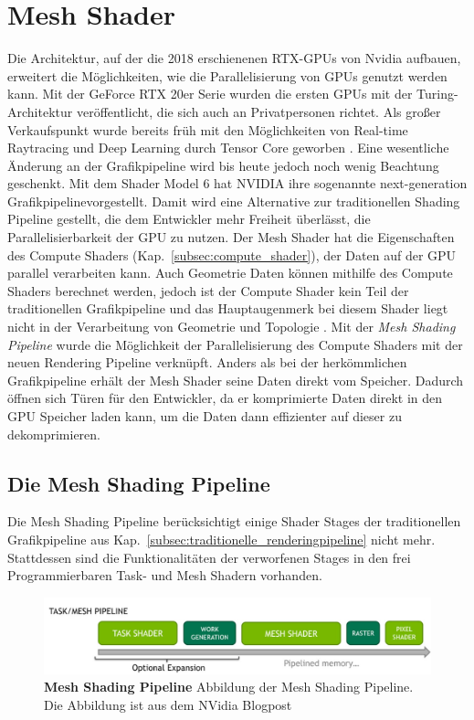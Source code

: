 \section{Mesh Shader}
Die Architektur, auf der die 2018 erschienenen RTX-GPUs von Nvidia aufbauen, erweitert die Möglichkeiten, wie die Parallelisierung von GPUs genutzt werden kann.
Mit der GeForce RTX 20er Serie wurden die ersten GPUs mit der Turing-Architektur veröffentlicht, die sich auch an Privatpersonen richtet.
Als großer Verkaufspunkt wurde bereits früh mit den Möglichkeiten von Real-time Raytracing und Deep Learning durch Tensor Core geworben \cite{Burgess2020}. 
Eine wesentliche Änderung an der Grafikpipeline wird bis heute jedoch noch wenig Beachtung geschenkt.
Mit dem Shader Model 6 hat NVIDIA ihre sogenannte \glqq next-generation Grafikpipeline\grqq vorgestellt.
Damit wird eine Alternative zur traditionellen Shading Pipeline gestellt, die dem Entwickler mehr Freiheit überlässt, die Parallelisierbarkeit der GPU zu nutzen.
Der Mesh Shader hat die Eigenschaften des Compute Shaders (Kap.~\ref{subsec:compute_shader}), der Daten auf der GPU parallel verarbeiten kann.
Auch Geometrie Daten können mithilfe des Compute Shaders berechnet werden, jedoch ist der Compute Shader kein Teil der traditionellen Grafikpipeline und das Hauptaugenmerk bei diesem Shader liegt nicht in der Verarbeitung von Geometrie und Topologie \cite{Ilett2022}.
Mit der \textit{Mesh Shading Pipeline} wurde die Möglichkeit der Parallelisierung des Compute Shaders mit der neuen Rendering Pipeline verknüpft.
Anders als bei der herkömmlichen Grafikpipeline erhält der Mesh Shader seine Daten direkt vom Speicher. 
Dadurch öffnen sich Türen für den Entwickler, da er komprimierte Daten direkt in den GPU Speicher laden kann, um die Daten dann effizienter auf dieser zu dekomprimieren.

\subsection{Die Mesh Shading Pipeline}
\label{subsec:meshshading_pipeline}
Die Mesh Shading Pipeline berücksichtigt einige Shader Stages der traditionellen Grafikpipeline aus Kap.~\ref{subsec:traditionelle_renderingpipeline} nicht mehr.
Stattdessen sind die Funktionalitäten der verworfenen Stages in den frei Programmierbaren Task- und Mesh Shadern vorhanden.
\begin{figure}[htb]
  \centering  
  \includegraphics[scale=0.43]{Bilder/Mesh_shading_pipeline.jpg}
  \caption[Mesh Shading Pipeline]{\textbf{Mesh Shading Pipeline} Abbildung der Mesh Shading Pipeline.
  Die Abbildung ist aus dem NVidia Blogpost \cite{Kubisch2018} }
  \label{fig:mesh_shading_pipeline}
\end{figure}

